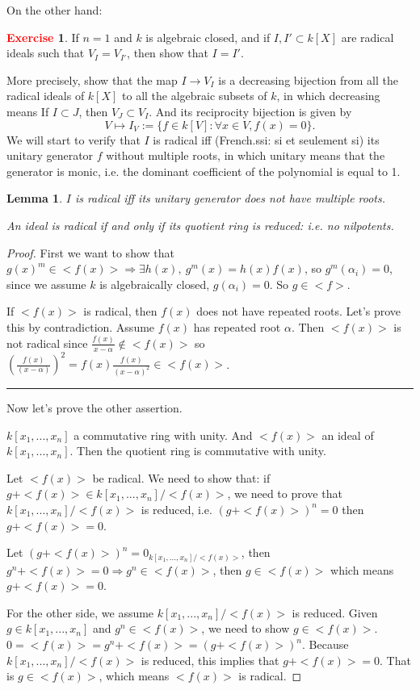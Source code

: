 \documentclass[12pt,a4paper,english]{article}
\theoremstyle{plain}
\newtheorem{lem}[thm]{Lemma}
\theoremstyle{definition}
\newtheorem{exercise}{\textbf{\textcolor{red}{Exercise}}}
\theoremstyle{remark}
\begin{document}
On the other hand:
\begin{exercise}
If $n=1$ and $k$ is algebraic closed, and if $I,I'\subset k[X]$ are radical ideals such that $V_{I}=V_{I'}$, then show that $I=I'$.

More precisely, show that the map $I\rightarrow V_{I}$ is a decreasing bijection from all the radical ideals of $k[X]$ to all the algebraic subsets of $k$, in which decreasing means If $I\subset J$, then $V_{J}\subset V_{I}$. And its reciprocity bijection
is given by 
\begin{equation*}
    V\mapsto I_{V}:=\{f\in k[V]:\forall x\in V,f(x)=0\}.
\end{equation*}
We will start to verify that $I$ is radical iff (French.ssi: si et seulement si) its unitary generator $f$ without multiple roots, in which unitary means that the generator is monic, i.e. the dominant coefficient of the polynomial is equal to 1.      
\end{exercise}
\begin{lem}\label{lemradical}
$I$ is radical iff its unitary generator does not have multiple roots. 

An ideal is radical if and only if its quotient ring is reduced: i.e. no nilpotents.
\end{lem}
\begin{proof}
First we want to show that $g(x)^{m}\in<f(x)>\Rightarrow \exists h(x),\ g^{m}(x)=h(x)f(x)$, so $g^{m}(\alpha_{i})=0$, since we assume $k$ is algebraically closed, $g(\alpha_{i})=0$. So $g\in<f>$.

If $<f(x)>$ is radical, then $f(x)$ does not have repeated roots. Let's prove this by contradiction. Assume $f(x)$ has repeated root $\alpha$. Then $<f(x)>$ is not radical since $\frac{f(x)}{x-\alpha}\not\in <f(x)>$ so $(\frac{f(x)}{(x-\alpha)})^{2}=f(x)\frac{f(x)}{(x-\alpha)^{2}}\in <f(x)>$.

\noindent\rule[0.25\baselineskip]{\textwidth}{1pt}
Now let's prove the other assertion.

$k[x_{1},...,x_{n}]$ a commutative ring with unity. And $<f(x)>$ an ideal of $k[x_{1},...,x_{n}]$.
Then the quotient ring is commutative with unity. 

Let $<f(x)>$ be radical. We need to show that: if $g+<f(x)>\in k[x_{1},...,x_{n}]/<f(x)>$, we need to prove that $k[x_{1},...,x_{n}]/<f(x)>$ is reduced, i.e. $(g+<f(x)>)^{n}=0$ then $g+<f(x)>=0$.

Let $(g+<f(x)>)^{n}=0_{ k[x_{1},...,x_{n}]/<f(x)>}$, then $g^{n}+<f(x)>=0\Rightarrow g^{n}\in<f(x)>$, then $g\in <f(x)>$ which means $g+<f(x)>=0$.

For the other side, we assume $k[x_{1},...,x_{n}]/<f(x)>$ is reduced. Given $g\in k[x_{1},...,x_{n}]$ and $g^{n}\in <f(x)>$, we need to show $g\in <f(x)>$. $0=<f(x)>=g^{n}+<f(x)>=(g+<f(x)>)^{n}$. Because $k[x_{1},...,x_{n}]/<f(x)>$ is reduced, this implies that $g+<f(x)>=0$. That is $g\in<f(x)>$, which means $<f(x)>$ is radical.
\end{proof}
\end{document}

